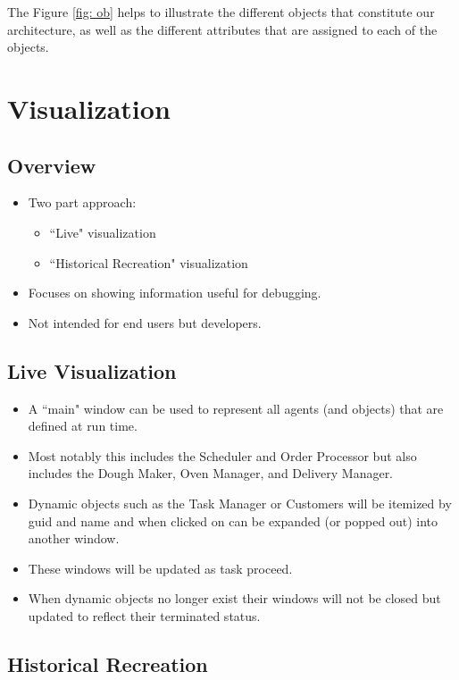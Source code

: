 \documentclass[a4paper]{article}
\begin{document}
	The Figure \ref{fig: ob} helps to illustrate the different objects that constitute our architecture, as well as the different attributes that are assigned to each of the objects. 
	
	\section{Visualization}
	
	\subsection{Overview}
	
	\begin{itemize}
		\item Two part approach: 
		\begin{itemize}
			\item ``Live" visualization 
			\item ``Historical Recreation" visualization
		\end{itemize}
		\item Focuses on showing information useful for debugging.
		\item Not intended for end users but developers.
	\end{itemize}
	
	\subsection{Live Visualization}
	
	\begin{itemize}
		\item A ``main" window can be used to represent all agents (and objects) that are defined at run time.
		\item Most notably this includes the Scheduler and Order Processor but also includes the Dough Maker, Oven Manager, and Delivery Manager.
		\item Dynamic objects such as the Task Manager or Customers will be itemized by guid and name and when clicked on can be expanded (or popped out) into another window.
		\item These windows will be updated as task proceed.
		\item When dynamic objects no longer exist their windows will not be closed but updated to reflect their terminated status.
	\end{itemize}
	
	\subsection{Historical Recreation}
	
\end{document}
